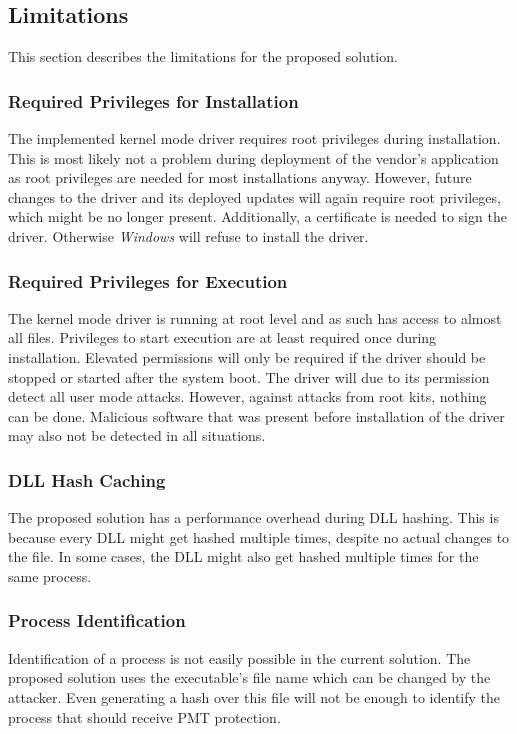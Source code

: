 \subsection{Limitations}
This section describes the limitations for the proposed solution.
\subsubsection{Required Privileges for Installation}
The implemented kernel mode driver requires root privileges during installation. This is most likely not a problem during deployment of the vendor's application as root privileges are needed for most installations anyway. However, future changes to the driver and its deployed updates will again require root privileges, which might be no longer present. Additionally, a certificate is needed to sign the driver. Otherwise \emph{Windows} will refuse to install the driver.
\subsubsection{Required Privileges for Execution}
The kernel mode driver is running at root level and as such has access to almost all files. Privileges to start execution are at least required once during installation. Elevated permissions will only be required if the driver should be stopped or started after the system boot. The driver will due to its permission detect all user mode attacks. However, against attacks from root kits, nothing can be done. Malicious software that was present before installation of the driver may also not be detected in all situations.
\subsubsection{DLL Hash Caching}
The proposed solution has a performance overhead during \gls{DLL} hashing. This is because every \gls{DLL} might get hashed multiple times, despite no actual changes to the file. In some cases, the \gls{DLL} might also get hashed multiple times for the same process. 
\subsubsection{Process Identification}
Identification of a process is not easily possible in the current solution. The proposed solution uses the executable's file name which can be changed by the attacker. Even generating a hash over this file will not be enough to identify the process that should receive \gls{PMT} protection. 
